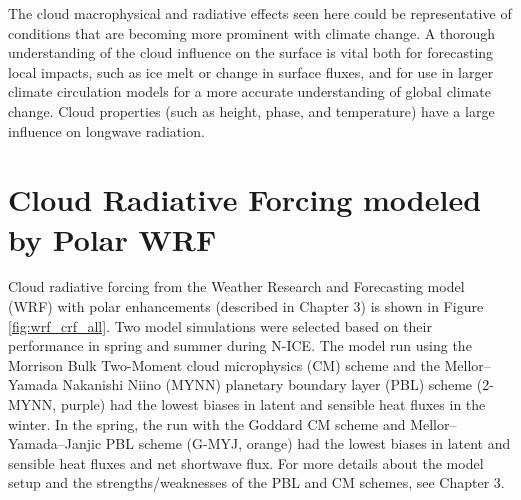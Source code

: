 The cloud macrophysical and radiative effects seen here could be representative of conditions that are becoming more prominent with climate change. A thorough understanding of the cloud influence on the surface is vital both for forecasting local impacts, such as ice melt or change in surface fluxes, and for use in larger climate circulation models for a more accurate understanding of global climate change. Cloud properties (such as height, phase, and temperature) have a large influence on longwave radiation.

\section{Cloud Radiative Forcing modeled by Polar WRF}
Cloud radiative forcing from the Weather Research and Forecasting model (WRF) with polar enhancements (described in Chapter 3) is shown in Figure \ref{fig:wrf_crf_all}. Two model simulations were selected based on their performance in spring and summer during N-ICE. The model run using the Morrison Bulk Two-Moment cloud microphysics (CM) scheme and the Mellor–Yamada Nakanishi Niino (MYNN) planetary boundary layer (PBL) scheme (2-MYNN, purple) had the lowest biases in latent and sensible heat fluxes in the winter. In the spring, the run with the Goddard CM scheme and Mellor–Yamada–Janjic PBL scheme (G-MYJ, orange) had the lowest biases in latent and sensible heat fluxes and net shortwave flux. For more details about the model setup and the strengths/weaknesses of the PBL and CM schemes, see Chapter 3.

